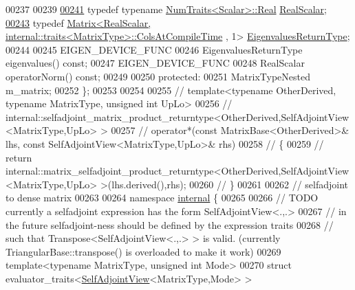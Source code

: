 \begin{DoxyCode}
00237 
00239 
\hyperlink{group___core___module_af9f0234ebeae4c4ca512bcd5fb5e8bb1}{00241}     \textcolor{keyword}{typedef} \textcolor{keyword}{typename} \hyperlink{group___core___module_struct_eigen_1_1_num_traits}{NumTraits<Scalar>::Real} \hyperlink{group___core___module_af9f0234ebeae4c4ca512bcd5fb5e8bb1}{RealScalar};
\hyperlink{group___core___module_a8ae92703d920130b38a383f8b165146c}{00243}     \textcolor{keyword}{typedef} \hyperlink{group___core___module_class_eigen_1_1_matrix}{Matrix<RealScalar, internal::traits<MatrixType>::ColsAtCompileTime}
      , 1> \hyperlink{group___core___module_a8ae92703d920130b38a383f8b165146c}{EigenvaluesReturnType};
00244 
00245     EIGEN\_DEVICE\_FUNC
00246     EigenvaluesReturnType eigenvalues() \textcolor{keyword}{const};
00247     EIGEN\_DEVICE\_FUNC
00248     RealScalar operatorNorm() \textcolor{keyword}{const};
00249 
00250   \textcolor{keyword}{protected}:
00251     MatrixTypeNested m\_matrix;
00252 \};
00253 
00254 
00255 \textcolor{comment}{// template<typename OtherDerived, typename MatrixType, unsigned int UpLo>}
00256 \textcolor{comment}{// internal::selfadjoint\_matrix\_product\_returntype<OtherDerived,SelfAdjointView<MatrixType,UpLo> >}
00257 \textcolor{comment}{// operator*(const MatrixBase<OtherDerived>& lhs, const SelfAdjointView<MatrixType,UpLo>& rhs)}
00258 \textcolor{comment}{// \{}
00259 \textcolor{comment}{//   return internal::matrix\_selfadjoint\_product\_returntype<OtherDerived,SelfAdjointView<MatrixType,UpLo>
       >(lhs.derived(),rhs);}
00260 \textcolor{comment}{// \}}
00261 
00262 \textcolor{comment}{// selfadjoint to dense matrix}
00263 
00264 \textcolor{keyword}{namespace }\hyperlink{namespaceinternal}{internal} \{
00265 
00266 \textcolor{comment}{// TODO currently a selfadjoint expression has the form SelfAdjointView<.,.>}
00267 \textcolor{comment}{//      in the future selfadjoint-ness should be defined by the expression traits}
00268 \textcolor{comment}{//      such that Transpose<SelfAdjointView<.,.> > is valid. (currently TriangularBase::transpose() is
       overloaded to make it work)}
00269 \textcolor{keyword}{template}<\textcolor{keyword}{typename} MatrixType, \textcolor{keywordtype}{unsigned} \textcolor{keywordtype}{int} Mode>
00270 \textcolor{keyword}{struct }evaluator\_traits<\hyperlink{group___core___module_class_eigen_1_1_self_adjoint_view}{SelfAdjointView}<MatrixType,Mode> >

\end{DoxyCode}
